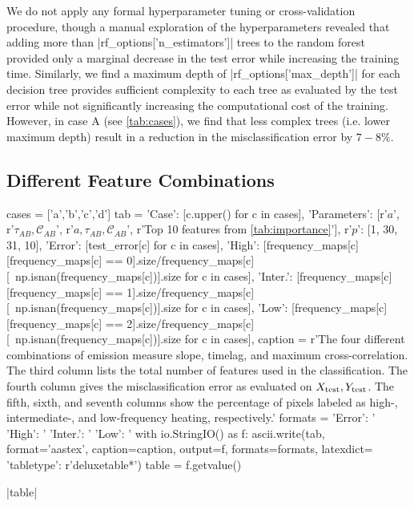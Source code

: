 We do not apply any formal hyperparameter tuning or cross-validation procedure, though a manual exploration of the hyperparameters revealed that adding more than \py[manager_ml]|rf_options['n_estimators']| trees to the random forest provided only a marginal decrease in the test error while increasing the training time. Similarly, we find a maximum depth of \py[manager_ml]|rf_options['max_depth']| for each decision tree provides sufficient complexity to each tree as evaluated by the test error while not significantly increasing the computational cost of the training. However, in case A (see \autoref{tab:cases}), we find that less complex trees (i.e. lower maximum depth) result in a reduction in the misclassification error by $7-8\%$.

\subsection{Different Feature Combinations}\label{sec:feature-combos}

\begin{pycode}[manager_ml]
cases = ['a','b','c','d']
tab = {
    'Case': [c.upper() for c in cases],
    'Parameters': [r'$a$', r'$\tau_{AB},\mathcal{C}_{AB}$', r'$a,\tau_{AB},\mathcal{C}_{AB}$', r'Top 10 features from \autoref{tab:importance}'],
    r'$p$': [1, 30, 31, 10],
    'Error': [test_error[c] for c in cases],
    'High': [frequency_maps[c][frequency_maps[c] == 0].size/frequency_maps[c][~np.isnan(frequency_maps[c])].size for c in cases],
    'Inter.': [frequency_maps[c][frequency_maps[c] == 1].size/frequency_maps[c][~np.isnan(frequency_maps[c])].size for c in cases],
    'Low': [frequency_maps[c][frequency_maps[c] == 2].size/frequency_maps[c][~np.isnan(frequency_maps[c])].size for c in cases],
}
caption = r'The four different combinations of emission measure slope, timelag, and maximum cross-correlation. The third column lists the total number of features used in the classification. The fourth column gives the misclassification error as evaluated on $X_\textup{test},Y_\textup{test}$. The fifth, sixth, and seventh columns show the percentage of pixels labeled as high-, intermediate-, and low-frequency heating, respectively.\label{tab:cases}'
formats = {
    'Error': '%
    'High': '%
    'Inter.': '%
    'Low': '%
}
with io.StringIO() as f:
    ascii.write(tab, format='aastex', caption=caption, output=f, formats=formats, latexdict={ 'tabletype': r'deluxetable*'})
    table = f.getvalue()
\end{pycode}
\py[manager_ml]|table|

